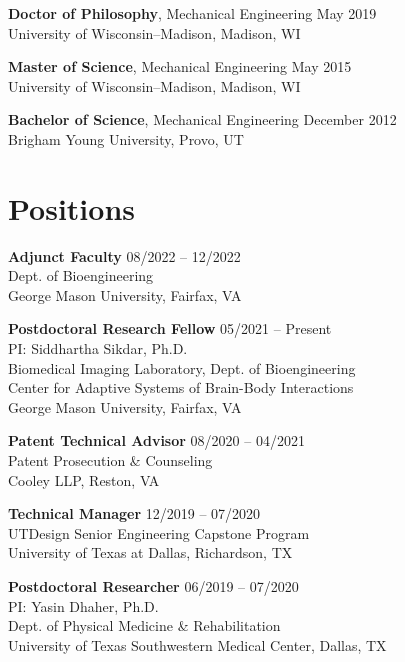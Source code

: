 \documentclass[letterpaper, 10pt]{article}
\begin{document}
\textbf{Doctor of Philosophy}, Mechanical Engineering 
\hfill May 2019\\ 
University of Wisconsin–Madison, Madison, WI

\medskip

\textbf{Master of Science}, Mechanical Engineering 
\hfill May 2015\\
University of Wisconsin–Madison, Madison, WI

\medskip

\textbf{Bachelor of Science}, Mechanical Engineering 
\hfill December 2012\\
Brigham Young University, Provo, UT

\section{Positions}

\textbf{Adjunct Faculty} 
\hfill 08/2022 -- 12/2022
\\Dept. of Bioengineering 
\\George Mason University, Fairfax, VA

\medskip

\textbf{Postdoctoral Research Fellow} 
\hfill 05/2021 -- Present
\\PI: Siddhartha Sikdar, Ph.D.
\\Biomedical Imaging Laboratory, Dept. of Bioengineering 
\\Center for Adaptive Systems of Brain-Body Interactions 
\\George Mason University, Fairfax, VA

\medskip

\textbf{Patent Technical Advisor}
\hfill 08/2020 -- 04/2021
\\Patent Prosecution \& Counseling 
\\Cooley LLP, Reston, VA

\medskip

\textbf{Technical Manager} \hfill 12/2019 -- 07/2020
\\UTDesign Senior Engineering Capstone Program 
\\University of Texas at Dallas, Richardson, TX

\medskip

\textbf{Postdoctoral Researcher} \hfill 06/2019 -- 07/2020
\\PI: Yasin Dhaher, Ph.D.
\\Dept. of Physical Medicine \& Rehabilitation 
\\University of Texas Southwestern Medical Center, Dallas, TX
\end{document}
